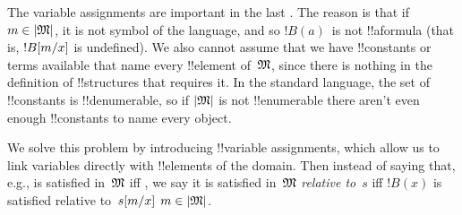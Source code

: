 \documentclass[../../../include/open-logic-section]{subfiles}
\begin{document}
\begin{explain}
The variable assignments are important in the last
. The reason is that if $m \in
\Domain M$, it is not symbol of the language, and so $!B(a)$~is not
!!a{formula} (that is, $!B[m/x]$ is undefined).  We also
cannot assume that we have !!{constant}s or terms available that name
every !!{element} of~$\Struct{M}$, since there is nothing in the
definition of !!{structure}s that requires it.  In the standard
language, the set of !!{constant}s is !!{denumerable}, so if
$\Domain{M}$ is not !!{enumerable} there aren't even enough
!!{constant}s to name every object. 

We solve this problem by introducing !!{variable} assignments, which
allow us to link variables directly with !!{element}s of the domain.
Then instead of saying that, e.g.,
 is satisfied
in~$\Struct M$ iff , we say it
is satisfied in~$\Struct M$ \emph{relative to}~$s$ iff $!B(x)$ is
satisfied relative to~$s[m/x]$  $m \in \Domain M$.
\end{explain}
\end{document}
